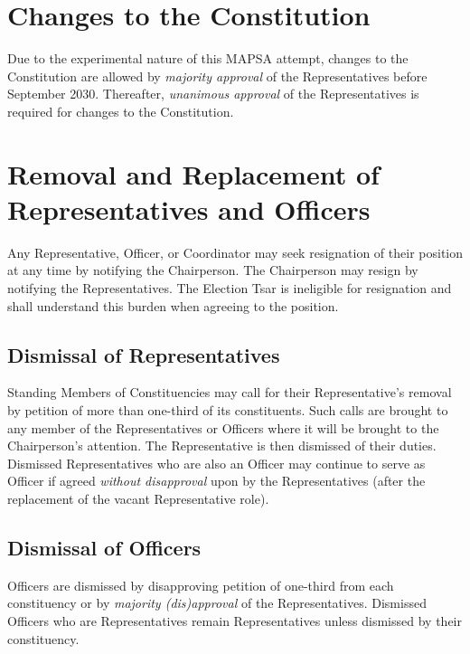\documentclass[8pt]{article}
\begin{document}
	\section{Changes to the Constitution}
	Due to the experimental nature of this MAPSA attempt, changes to the Constitution are allowed by \textit{majority approval} of the Representatives before September 2030. Thereafter, \textit{unanimous approval} of the Representatives is required for changes to the Constitution.
	
	\section{Removal and Replacement of Representatives and Officers}
	Any Representative, Officer, or Coordinator may seek resignation of their position at any time by notifying the Chairperson. The Chairperson may resign by notifying the Representatives. The Election Tsar is ineligible for resignation and shall understand this burden when agreeing to the position.
	\subsection{Dismissal of Representatives} Standing Members of Constituencies may call for their Representative's removal by petition of more than one-third of its constituents. Such calls are brought to any member of the Representatives or Officers where it will be brought to the Chairperson's attention. The Representative is then dismissed of their duties. Dismissed Representatives who are also an Officer may continue to serve as Officer if agreed \textit{without disapproval} upon by the Representatives (after the replacement of the vacant Representative role).
	\subsection{Dismissal of Officers} Officers are dismissed by disapproving petition of one-third from each constituency or by \textit{majority (dis)approval} of the Representatives. Dismissed Officers who are Representatives remain Representatives unless dismissed by their constituency.
\end{document}

